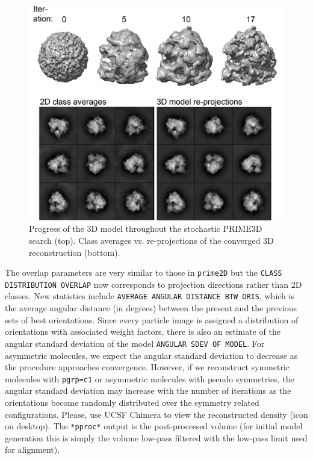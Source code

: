 \documentclass[a4paper,11pt]{article}
\newcommand{\prgname}[1]{\textcolor{NavyBlue}{\texttt{#1}}}
\begin{document}
\begin{figure}[H]
\includegraphics[keepaspectratio=true,scale=0.6]{./Pfrib3D/Pfrib3D}
\caption{Progress of the 3D model throughout the stochastic PRIME3D search (top). Class averages vs. re-projections of the converged 3D reconstruction (bottom).}
\end{figure}
The overlap parameters are very similar to those in \prgname{prime2D} but the \texttt{CLASS DISTRIBUTION OVERLAP} now corresponds to projection directions rather than 2D classes. New statistics include \texttt{AVERAGE ANGULAR DISTANCE BTW ORIS}, which is the average angular distance (in degrees) between the present and the previous sets of best orientations. Since every particle image is assigned a distribution of orientations with associated weight factors, there is also an estimate of the angular standard deviation of the model \texttt{ANGULAR SDEV OF MODEL}. For asymmetric molecules, we expect the angular standard deviation to decrease as the procedure approaches convergence. However, if we reconstruct symmetric molecules with \texttt{pgrp=c1} or asymmetric molecules with pseudo symmetries, the angular standard deviation may increase with the number of iterations as the orientations become randomly  distributed over the symmetry related configurations. Please, use UCSF Chimera to view the reconstructed density (icon on desktop). The \texttt{*pproc*} output is the post-processed volume (for initial model generation this is simply the volume low-pass filtered with the low-pass limit used for alignment).
\end{document}
